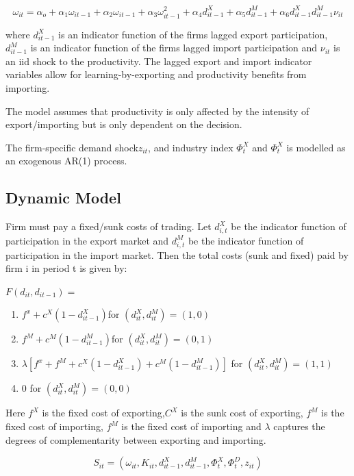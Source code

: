 \documentclass[11pt]{article}
\begin{document}
\begin{equation}
\omega_{it} = \alpha_{o} + \alpha_{1}\omega_{it-1} +
\alpha_{2}\omega_{it-1} + \alpha_{3}\omega_{it-1}^{2}+
\alpha_{4}d_{it-1}^{X} + \alpha_{5} d_{it-1}^{M} + \alpha_{6}d_{it-1}^{X}d_{it-1}^{M}  \nu_{it}
\end{equation}

where $d_{it-1}^{X}$ is an indicator function of the firms lagged export
participation, $d_{it-1}^{M}$ is an indicator function of the firms lagged import
participation and $\nu_{it}$ is an iid shock to the productivity. The
lagged export and import indicator variables allow for
learning-by-exporting and productivity benefits from importing. 

The model assumes that productivity is only affected by the intensity
of export/importing but is only dependent on the decision. 

The firm-specific demand shock$z_{it}$, and industry index $\Phi_{t}^{X}$  and
$\Phi_{t}^{X}$ is modelled as an exogenous AR(1) process. 


\subsection{Dynamic Model}
 
Firm must pay a fixed/sunk costs of trading. Let $d_{i,t}^X$ be the
indicator function of participation in the export market and
$d_{i,t}^M$ be the indicator function of participation in the import
market. Then the total costs (sunk and fixed) paid by firm i in period t is given by:


$F(d_{it}, d_{it-1})= $
\begin{enumerate}
\item   $f^{x} + c^{X}(1 - d_{it-1}^X)$\hfill  for $ (d_{it}^X, d_{it}^M) =
  (1,0) $
\item   $f^{M} + c^{M}(1 - d_{it-1}^M)$\hfill  for $ (d_{it}^X, d_{it}^M) =
  (0,1) $
\item   $\lambda[f^{x} + f^{M} + c^{X}(1 - d_{it-1}^X) + c^{M}(1 -
  d_{it-1}^M)]$  \hfill for $ (d_{it}^X, d_{it}^M) =
  (1,1) $
\item   0  \hfill for $ (d_{it}^X, d_{it}^M) =
  (0,0) $
\end{enumerate}
Here $f^{X}$ is the fixed cost of exporting,$C^{X}$ is the sunk cost
of exporting, $f^{M}$ is the fixed cost of importing, $f^{M}$ is the
fixed cost of importing and $\lambda$ captures the degrees of
complementarity between exporting and importing. 

$$ S_{it} = (\omega_{it}, K_{it}, d_{it-1}^{X}, d_{it-1}^{M},
\Phi_{t}^{X}, \Phi_{t}^{D}, z_{it})$$
\end{document}
